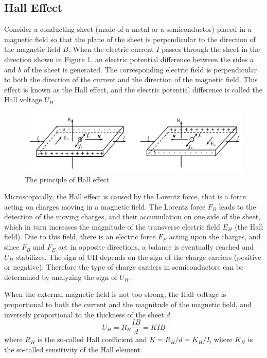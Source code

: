 \documentclass[12pt]{article}
\begin{document}
\subsection{Hall Effect}
Consider a conducting sheet (made of a metal or a semiconductor) placed in a magnetic
field so that the plane of the sheet is perpendicular to the direction of the magnetic field $B$. When the electric current $I$ passes through the sheet in the direction shown
in Figure 1, an electric potential difference between the sides $a$ and $b$ of the sheet is
generated. The corresponding electric field is perpendicular to both the direction of the
current and the direction of the magnetic field. This effect is known as the Hall effect,
and the electric potential difference is called the Hall voltage $U_H$.
\begin{figure}[H]
\centering
\includegraphics[scale=0.3]{P1.jpg}
\caption{The principle of Hall effect}
\end{figure}
Microscopically, the Hall effect is caused by the Lorentz force, that is a force acting on
charges moving in a magnetic field. The Lorentz force $F_B$ leads to the detection of the
moving charges, and their accumulation on one side of the sheet, which in turn increases
the magnitude of the transverse electric field $E_H$ (the Hall field). Due to this field, there
is an electric force $F_E$ acting upon the charges, and since $F_B$ and $F_E$ act in opposite
directions, a balance is eventually reached and $U_H$ stabilizes. The sign of UH depends on
the sign of the charge carriers (positive or negative). Therefore the type of charge carriers
in semiconductors can be determined by analyzing the sign of $U_H$.
\par When the external magnetic field is not too strong, the Hall voltage is proportional
to both the current and the magnitude of the magnetic field, and inversely proportional
to the thickness of the sheet $d$
\begin{equation}
U_H=R_H\frac{IB}{d}=KIB
\end{equation}
where $R_H$ is the so-called Hall coefficient and $K=R_H/d=K_H/I$, where $K_H$ is the so-called sensitivity of the Hall element.
\end{document}
